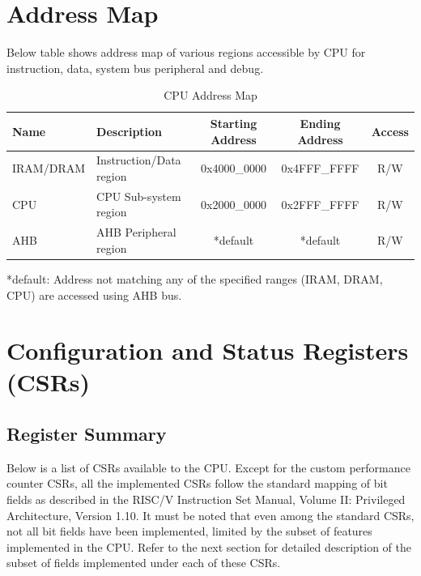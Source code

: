 \documentclass[main\_\_EN.tex]{subfiles}
\begin{document}
\section{Address Map}

Below table shows address map of various regions accessible by CPU for instruction, data, system bus peripheral and debug.

\begin{longtable}{| l| l |c | c | c  |}
\caption{CPU Address Map} \label{tab:riscvcpu-mem-blocks}
\\ \hline
\rowcolor{lightgray}
Name & Description    &  Starting Address  &  Ending Address  & Access   \\ \hline
IRAM/DRAM\label{TBD1} & Instruction/Data region  &   0x4000\_0000  &  0x4FFF\_FFFF  &  R/W  \\ \hline
CPU \label{TBD4} & CPU Sub-system region  &      0x2000\_0000  &  0x2FFF\_FFFF  &  R/W  \\ \hline
AHB\label{TBD3} & AHB Peripheral region &      *default  &  *default  &  R/W  \\ \hline
\end{longtable}

*default: Address not matching any of the specified ranges (IRAM, DRAM, CPU) are accessed using AHB bus.



\section{Configuration and Status Registers (CSRs)}
\hypertarget{riscvcpu-cpu-reg-summ}{}
\subsection{Register Summary}
\label{sec:riscvcpu-cpu-reg-summ}


Below is a list of CSRs available to the CPU. Except for the custom performance counter CSRs, all the implemented CSRs follow the standard mapping of bit fields as described in the RISC\-/V Instruction Set Manual, Volume II: Privileged Architecture, Version 1.10. It must be noted that even among the standard CSRs, not all bit fields have been implemented, limited by the subset of features implemented in the CPU. Refer to the next section for detailed description of the subset of fields implemented under each of these CSRs.


\end{document}
